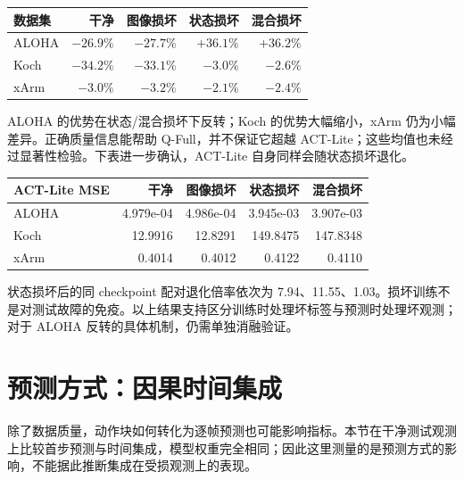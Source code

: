 \documentclass[11pt,a4paper,fontset=fandol]{ctexart}
\begin{document}
\begin{center}
\small
\begin{tabular}{lrrrr}
\toprule
数据集 & 干净 & 图像损坏 & 状态损坏 & 混合损坏 \\
\midrule
ALOHA & $-26.9\%$ & $-27.7\%$ & $+36.1\%$ & $+36.2\%$ \\
Koch & $-34.2\%$ & $-33.1\%$ & $-3.0\%$ & $-2.6\%$ \\
xArm & $-3.0\%$ & $-3.2\%$ & $-2.1\%$ & $-2.4\%$ \\
\bottomrule
\end{tabular}
\end{center}
ALOHA 的优势在状态/混合损坏下反转；Koch 的优势大幅缩小，xArm 仍为小幅差异。正确质量信息能帮助 Q-Full，并不保证它超越 ACT-Lite；这些均值也未经过显著性检验。下表进一步确认，ACT-Lite 自身同样会随状态损坏退化。

\begin{center}
\small
\begin{tabular}{lrrrr}
\toprule
ACT-Lite MSE & 干净 & 图像损坏 & 状态损坏 & 混合损坏 \\
\midrule
ALOHA & 4.979e-04 & 4.986e-04 & 3.945e-03 & 3.907e-03 \\
Koch & 12.9916 & 12.8291 & 149.8475 & 147.8348 \\
xArm & 0.4014 & 0.4012 & 0.4122 & 0.4110 \\
\bottomrule
\end{tabular}
\end{center}
状态损坏后的同 checkpoint 配对退化倍率依次为 7.94、11.55、1.03。损坏训练不是对测试故障的免疫。以上结果支持区分训练时处理坏标签与预测时处理坏观测；对于 ALOHA 反转的具体机制，仍需单独消融验证。

\clearpage\section{预测方式：因果时间集成}
除了数据质量，动作块如何转化为逐帧预测也可能影响指标。本节在干净测试观测上比较首步预测与时间集成，模型权重完全相同；因此这里测量的是预测方式的影响，不能据此推断集成在受损观测上的表现。
\end{document}
